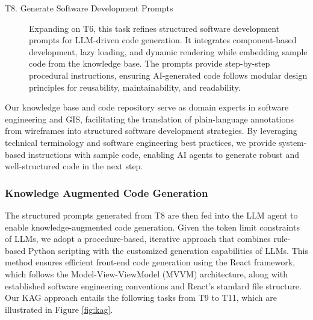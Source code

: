 \begin{description}
\begin{description}
    \item[T8. Generate Software Development Prompts]  
    Expanding on T6, this task refines structured software development prompts for LLM-driven code generation. It integrates component-based development, lazy loading, and dynamic rendering while embedding sample code from the knowledge base. The prompts provide step-by-step procedural instructions, ensuring AI-generated code follows modular design principles for reusability, maintainability, and readability.
\end{description}

Our knowledge base and code repository serve as domain experts in software engineering and GIS, facilitating the translation of plain-language annotations from wireframes into structured software development strategies. By leveraging technical terminology and software engineering best practices, we provide system-based instructions with sample code, enabling AI agents to generate robust and well-structured code in the next step.


\subsubsection{Knowledge Augmented Code Generation}
\label{subsec:simulations3}
The structured prompts generated from T8 are then fed into the LLM agent to enable knowledge-augmented code generation. Given the token limit constraints of LLMs, we adopt a procedure-based, iterative approach that combines rule-based Python scripting with the customized generation capabilities of LLMs. This method ensures efficient front-end code generation using the React framework, which follows the Model-View-ViewModel (MVVM) architecture, along with established software engineering conventions and React’s standard file structure. Our KAG approach entails the following tasks from T9 to T11, which are illustrated in Figure \ref{fig:kag}. 


\end{description}
